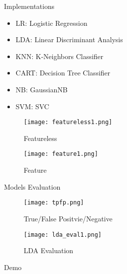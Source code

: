 \begin{frame}{Implementations}
    \begin{itemize}
      \item LR: Logistic Regression
      \item LDA: Linear Discriminant Analysis
      \item KNN: K-Neighbors Classifier
      \item CART: Decision Tree Classifier
      \item NB: GaussianNB
      \item SVM: SVC
    \end{itemize}

    \begin{minipage}{0.5\textwidth}
        \centering
        \begin{figure}
    \texttt{[image: featureless1.png]}
        \caption{Featureless}
        \end{figure}
    \end{minipage}%
    \begin{minipage}{0.5\textwidth}
        \begin{figure}
        \centering
    \texttt{[image: feature1.png]}
        \caption{Feature}
        \end{figure}
    \end{minipage}
\end{frame}

\begin{frame}{Models Evaluation}
    \begin{figure}
    \centering
    \texttt{[image: tpfp.png]}
    \caption{True/False Positvie/Negative}
    \end{figure}

    \begin{figure}
    \centering
    \texttt{[image: lda\_eval1.png]}
    \caption{LDA Evaluation}
    \end{figure}
\end{frame}

\begin{frame}{Demo}
\end{frame}
